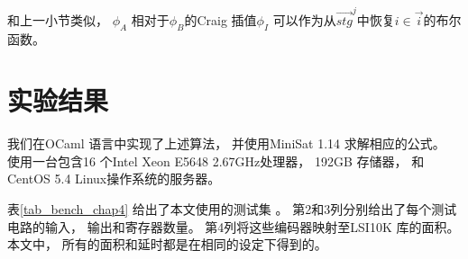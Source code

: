 和上一小节类似，
$\phi_A$ 相对于$\phi_B$的Craig 插值$\phi_I$
可以作为从$\vec{stg}^j$中恢复$i\in\vec{i}$的布尔函数。



\section{实验结果}\label{sec_exp_chap4}
我们在OCaml 语言中实现了上述算法，
并使用MiniSat 1.14 求解相应的公式。
使用一台包含16 个Intel Xeon E5648 2.67GHz处理器，
192GB 存储器， 和CentOS 5.4 Linux操作系统的服务器。

表\ref{tab_bench_chap4} 给出了本文使用的测试集 。
第2和3列分别给出了每个测试电路的输入， 输出和寄存器数量。
第4列将这些编码器映射至LSI10K 库的面积。
本文中，
所有的面积和延时都是在相同的设定下得到的。



